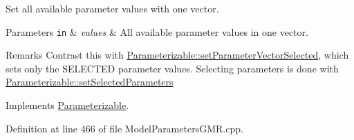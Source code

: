 Set all available parameter values with one vector. 


\begin{DoxyParams}[1]{Parameters}
\mbox{\tt in}  & {\em values} & All available parameter values in one vector. \\
\hline
\end{DoxyParams}
\begin{DoxyRemark}{Remarks}
Contrast this with \hyperlink{classDmpBbo_1_1Parameterizable_aee501e63a46d63eb58a6f271bf093b9d}{Parameterizable\+::set\+Parameter\+Vector\+Selected}, which sets only the S\+E\+L\+E\+C\+T\+E\+D parameter values. Selecting parameters is done with \hyperlink{classDmpBbo_1_1Parameterizable_a8a976b5db2d1809ece10e431816f0f27}{Parameterizable\+::set\+Selected\+Parameters} 
\end{DoxyRemark}


Implements \hyperlink{classDmpBbo_1_1Parameterizable_acef2ee975b497baf60b1f38da2b65f0d}{Parameterizable}.



Definition at line 466 of file Model\+Parameters\+G\+M\+R.\+cpp.


